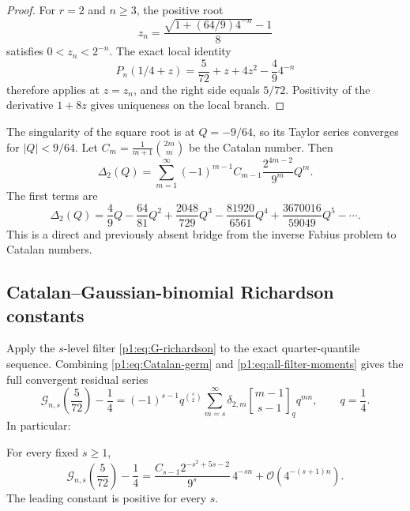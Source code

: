 \documentclass[11pt,oneside]{article}
\numberwithin{equation}{section}
\theoremstyle{definition}
\theoremstyle{remark}
\newcommand{\bigO}{\mathcal O}
\newcommand{\qbinom}[3]{\genfrac{[}{]}{0pt}{}{#1}{#2}_{#3}}
\begin{document}
\begin{proof}
For $r=2$ and $n\ge3$, the positive root
\[
 z_n=\frac{\sqrt{1+(64/9)4^{-n}}-1}{8}
\]
satisfies $0<z_n<2^{-n}$.  The exact local identity
\[
 P_n(1/4+z)=\frac5{72}+z+4z^2-\frac49 4^{-n}
\]
therefore applies at $z=z_n$, and the right side equals $5/72$.  Positivity of
the derivative $1+8z$ gives uniqueness on the local branch.
\end{proof}

The singularity of the square root is at $Q=-9/64$, so its Taylor series converges
for $|Q|<9/64$.  Let $C_m=\frac1{m+1}\binom{2m}{m}$ be the Catalan number.
Then
\begin{equation}
 \boxed{
 \Delta_2(Q)=\sum_{m=1}^{\infty}
 (-1)^{m-1}C_{m-1}\frac{2^{4m-2}}{9^m}Q^m.}
 \label{p1:eq:Catalan-germ}
\end{equation}
The first terms are
\begin{equation}
 \Delta_2(Q)=\frac49Q-\frac{64}{81}Q^2
 +\frac{2048}{729}Q^3-\frac{81920}{6561}Q^4
 +\frac{3670016}{59049}Q^5-\cdots.
 \label{p1:eq:Catalan-first}
\end{equation}
This is a direct and previously absent bridge from the inverse Fabius problem to Catalan
numbers.

\subsection{Catalan--Gaussian-binomial Richardson constants}

Apply the $s$-level filter \eqref{p1:eq:G-richardson} to the exact quarter-quantile
sequence.  Combining \eqref{p1:eq:Catalan-germ} and
\eqref{p1:eq:all-filter-moments} gives the full convergent residual series
\begin{equation}
 \boxed{
 \mathcal G_{n,s}\!\left(\frac5{72}\right)-\frac14
 =(-1)^{s-1}q^{\binom s2}
 \sum_{m=s}^{\infty}
 \delta_{2,m}\qbinom{m-1}{s-1}{q}q^{mn},
 \qquad q=\frac14.}
 \label{p1:eq:Catalan-qbinom-full}
\end{equation}
In particular:

\begin{corollary}
\label{p1:cor:Catalan-Richardson}
For every fixed $s\ge1$,
\begin{equation}
 \boxed{
 \mathcal G_{n,s}\!\left(\frac5{72}\right)-\frac14
 =\frac{C_{s-1}2^{-s^2+5s-2}}{9^s}\,4^{-sn}
 +\bigO(4^{-(s+1)n}).}
 \label{p1:eq:Catalan-Richardson}
\end{equation}
The leading constant is positive for every $s$.
\end{corollary}
\end{document}
